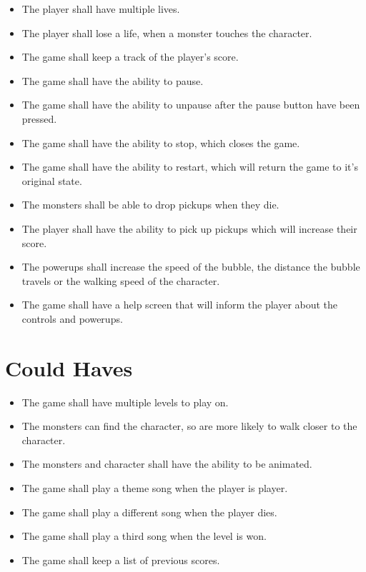 \begin{itemize}
\itemsep0em 
 \item The player shall have multiple lives.
 \item The player shall lose a life, when a monster touches the character. 
 \item The game shall keep a track of the player's score.
 \item The game shall have the ability to pause.
 \item The game shall have the ability to unpause after the pause button have been pressed.
 \item The game shall have the ability to stop, which closes the game.
 \item The game shall have the ability to restart, which will return the game to it's original state.
 \item The monsters shall be able to drop pickups when they die.
 \item The player shall have the ability to pick up pickups which will increase their score.
 \item The powerups shall increase the speed of the bubble, the distance the bubble travels or the walking speed of the character.
 \item The game shall have a help screen that will inform the player about the controls and powerups.
\end{itemize}

\section{Could Haves}

\begin{itemize}
\itemsep0em 
  \item The game shall have multiple levels to play on.
  \item The monsters can find the character, so are more likely to walk closer to the character.
  \item The monsters and character shall have the ability to be animated.
  \item The game shall play a theme song when the player is player.
  \item The game shall play a different song when the player dies.
  \item The game shall play a third song when the level is won.
  \item The game shall keep a list of previous scores.
\end{itemize}

